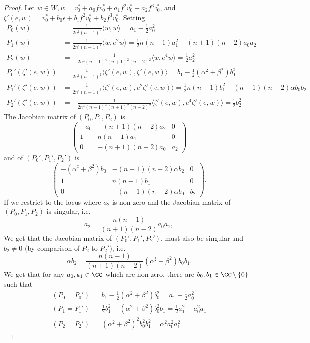 \documentclass[11pt]{article}
\begin{document}
\begin{proof}
    Let $w\in W, w = v_0^*+a_0fv_0^* + a_1f^2v_0^* + a_2 f^3v_0^*$, and $\zeta'(e, w) = v_0^* + b_0\epsilon + b_1f^2v_0^* + b_2f^3v_0^*$.
    Setting
    \[\begin{aligned}
        P_0(w) &= \frac{1}{2n^2(n-1)^2}\langle w, w\rangle = a_1-\frac{1}{2}a_0^2\\
        P_1(w) &= \frac{1}{2n^3(n-1)^3}\langle w, e^2 w\rangle = \frac{1}{2}n(n-1)a_1^2 - (n+1)(n-2)a_0a_2\\
        P_2(w) &= -\frac{1}{2n^4(n-1)^4(n+1)^2(n-2)^2}\langle w, e^4 w\rangle = \frac{1}{2}a_2^2\\
        P_0'(\zeta'(e, w)) &= \frac{1}{2n^2(n-1)^2}\langle \zeta'(e, w), \zeta'(e, w)\rangle = b_1-\frac{1}{2}(\alpha^2+\beta^2)b_0^2\\
        P_1'(\zeta'(e, w)) &= \frac{1}{2n^3(n-1)^3}\langle \zeta'(e, w), e^2 \zeta'(e, w)\rangle = \frac{1}{2}n(n-1)b_1^2 - (n+1)(n-2)\alpha b_0b_2\\
        P_2'(\zeta'(e, w)) &= -\frac{1}{2n^4(n-1)^4(n+1)^2(n-2)^2}\langle \zeta'(e, w), e^4 \zeta'(e, w)\rangle = \frac{1}{2}b_2^2
    \end{aligned}\]
    The Jacobian matrix of $(P_0, P_1, P_2)$ is $$\begin{pmatrix}
    -a_0&-(n+1)(n-2)a_2&0\\
    1&n(n-1)a_1&0\\
    0& -(n+1)(n-2)a_0 & a_2
    \end{pmatrix}$$
    and of $(P_0', P_1', P_2')$ is $$\begin{pmatrix}
    -(\alpha^2+\beta^2)b_0&-(n+1)(n-2)\alpha b_2&0\\
    1&n(n-1)b_1&0\\
    0& -(n+1)(n-2)\alpha b_0 & b_2
    \end{pmatrix}.$$
    If we restrict to the locus where $a_2$ is non-zero and the Jacobian matrix of $(P_0, P_1, P_2)$ is singular, i.e.
    $$a_2 = \frac{n(n-1)}{(n+1)(n-2)}a_0a_1,$$
    We get that the Jacobian matrix of $(P_0', P_1', P_2')$, must also be singular and $b_2\neq 0$ (by comparison of $P_2$ to $P_2'$), i.e.
    $$\alpha b_2 = \frac{n(n-1)}{(n+1)(n-2)}(\alpha^2+\beta^2)b_0b_1.$$
    We get that for any $a_0, a_1\in \CC$ which are non-zero, there are $b_0, b_1\in \CC\setminus\{0\}$ such that
    \[
    \begin{aligned}
        (P_0=P_0')&\ \ \ \ b_1-\frac{1}{2}(\alpha^2+\beta^2)b_0^2 = a_1-\frac{1}{2}a_0^2\\
        (P_1=P_1')&\ \ \ \ \frac{1}{2}b_1^2 - (\alpha^2+\beta^2)b_0^2b_1 = \frac{1}{2}a_1^2 - a_0^2a_1\\
        (P_2 = P_2')&\ \ \ \ (\alpha^2+\beta^2)^2b_0^2b_1^2 = \alpha^2 a_0^2a_1^2
    \end{aligned}
    \]


\end{proof}
\end{document}
